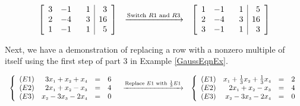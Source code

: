 \documentclass{ximera}
\begin{document}
\[\begin{array}{ccc}

\left[ \begin{array}{rrr|r} 
3 & -1 & \hphantom{-}1 & 3 \\ 
2 & -4 & 3 & 16 \\ 
1 & -1 & 1 & 5  \\
\end{array} \right]

&
\xrightarrow{\text{Switch $R1$ and $R3$}}

&

\left[ \begin{array}{rrr|r} 
1 & -1 & \hphantom{-}1 & 5  \\
2 & -4 & 3 & 16 \\ 
3 & -1 & 1 & 3 \\ 

\end{array} \right]

\end{array}\]

Next, we have a demonstration of replacing a row with a nonzero multiple of itself using the first step of part 3 in Example \ref{GaussEqnEx}.

 \[\begin{array}{ccc}

\left\{ 

\begin{array}{lrcr}

(E1) & 3x_{\mbox{\tiny$1$}} +x_{\mbox{\tiny$2$}} + x_{\mbox{\tiny$4$}} & = & 6 \\   
(E2) & 2x_{\mbox{\tiny$1$}} + x_{\mbox{\tiny$2$}} -x_{\mbox{\tiny$3$}}  & = & 4  \\
(E3) &  x_{\mbox{\tiny$2$}} -3x_{\mbox{\tiny$3$}} -2x_{\mbox{\tiny$4$}} & = & 0 \\

\end{array} 

\right.

&
\xrightarrow{\text{Replace $E1$ with $\frac{1}{3}E1$}}

&

\left\{ 

\begin{array}{lrcr}

(E1) & x_{\mbox{\tiny$1$}} + \frac{1}{3}x_{\mbox{\tiny$2$}} + \frac{1}{3}x_{\mbox{\tiny$4$}} & = & 2 \\  
(E2) & 2x_{\mbox{\tiny$1$}} + x_{\mbox{\tiny$2$}} -x_{\mbox{\tiny$3$}}  & = & 4  \\
(E3) &  x_{\mbox{\tiny$2$}} -3x_{\mbox{\tiny$3$}} -2x_{\mbox{\tiny$4$}} & = & 0 \\

\end{array} 

\right.

\end{array}\]
\end{document}
